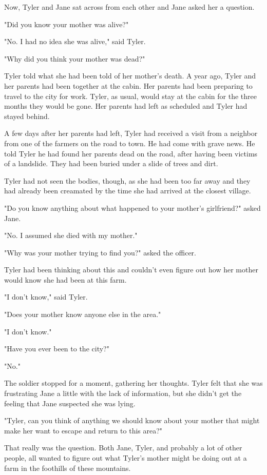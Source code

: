 \documentclass[courier]{sffms}
\begin{document}
Now, Tyler and Jane sat across from each other
and Jane asked her a question.

"Did you know your mother was alive?"

"No. I had no idea she was alive," said Tyler.

"Why did you think your mother was dead?"

Tyler told what she had been told of her
mother's death. A year ago, Tyler and her
parents had been together at the cabin.
Her parents had been preparing to travel to the
city for work. Tyler, as usual, would stay at the
cabin for the three months they would be
gone. Her parents had left as scheduled and
Tyler had stayed behind.

A few days after her parents had left, Tyler
had received a visit from a neighbor from 
one of the farmers on the road to town. He
had come with grave news. He told Tyler he had
found her parents dead on the road, after having 
been victims of a landslide. They had been buried
under a slide of trees and dirt.

Tyler had not seen the bodies, though, as she
had been too far away and they had already been
creamated by the time she had arrived at the
closest village.

"Do you know anything about what happened to
your mother's girlfriend?" asked Jane.

"No. I assumed she died with my mother."

"Why was your mother trying to find you?" asked
the officer.

Tyler had been thinking about this and couldn't even
figure out how her mother would know she had been
at this farm.

"I don't know," said Tyler.

"Does your mother know anyone else in the area."

"I don't know."

"Have you ever been to the city?"

"No."

The soldier stopped for a moment, gathering her
thoughts. Tyler felt that she was frustrating Jane
a little with the lack of information, but she didn't
get the feeling that Jane suspected she was
lying.

"Tyler, can you think of anything we should know
about your mother that might make her want
to escape and return to this area?"

That really was the question. Both Jane, Tyler,
and probably a lot of other people, all wanted 
to figure out what Tyler's mother might be doing
out at a farm in the foothills of these
mountains.
\end{document}
